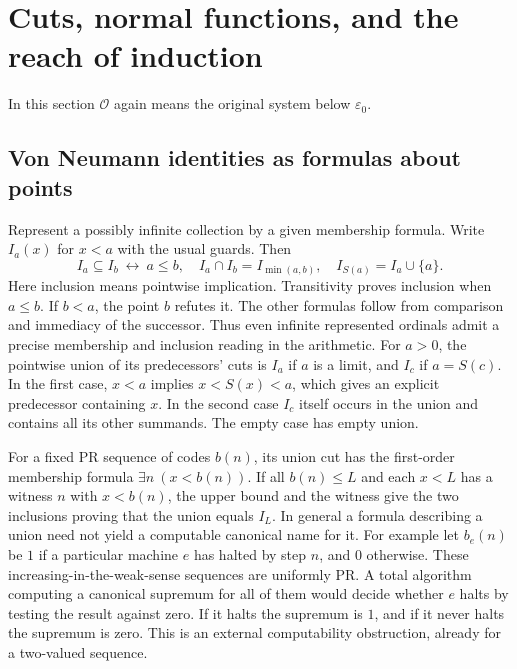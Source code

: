\section{Cuts, normal functions, and the reach of induction}
\label{sec:scope}
In this section $\mathcal O$ again means the original system below $\varepsilon_0$.
\subsection{Von Neumann identities as formulas about points}
Represent a possibly infinite collection by a given membership formula. Write $I_a(x)$ for $x<a$ with the usual guards. Then
\[
 I_a\subseteq I_b\ \longleftrightarrow\ a\le b,\quad
 I_a\cap I_b=I_{\min(a,b)},\quad I_{S(a)}=I_a\cup\{a\}.
\]
Here inclusion means pointwise implication. Transitivity proves inclusion when $a\le b$. If $b<a$, the point $b$ refutes it. The other formulas follow from comparison and immediacy of the successor. Thus even infinite represented ordinals admit a precise membership and inclusion reading in the arithmetic. For $a>0$, the pointwise union of its predecessors' cuts is $I_a$ if $a$ is a limit, and $I_c$ if $a=S(c)$. In the first case, $x<a$ implies $x<S(x)<a$, which gives an explicit predecessor containing $x$. In the second case $I_c$ itself occurs in the union and contains all its other summands. The empty case has empty union.

For a fixed PR sequence of codes $b(n)$, its union cut has the first-order membership formula $\exists n\ (x<b(n))$. If all $b(n)\le L$ and each $x<L$ has a witness $n$ with $x<b(n)$, the upper bound and the witness give the two inclusions proving that the union equals $I_L$. In general a formula describing a union need not yield a computable canonical name for it. For example let $b_e(n)$ be $1$ if a particular machine $e$ has halted by step $n$, and $0$ otherwise. These increasing-in-the-weak-sense sequences are uniformly PR. A total algorithm computing a canonical supremum for all of them would decide whether $e$ halts by testing the result against zero. If it halts the supremum is $1$, and if it never halts the supremum is zero. This is an external computability obstruction, already for a two-valued sequence.

